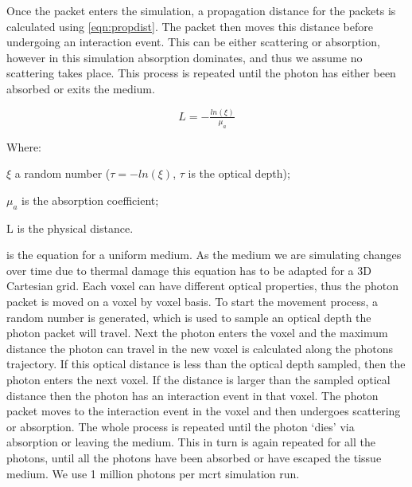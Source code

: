 Once the packet enters the simulation, a propagation distance for the packets is calculated using \cref{eqn:propdist}. The packet then moves this distance before undergoing an interaction event. This can be either scattering or absorption, however in this simulation absorption dominates, and thus we assume no scattering takes place. This process is repeated until the photon has either been absorbed or exits the medium.

\begin{equation}
L = -\tfrac{ln(\xi)}{\mu_a}
\label{eqn:propdist}
\end{equation}

\noindent Where:

\indent $\xi$ a random number ($\tau = -ln(\xi)$, $\tau$ is the optical depth);

\indent $\mu_a$ is the absorption coefficient;

\indent L is the physical distance.

\medskip

 is the equation for a uniform medium. As the medium we are simulating changes over time due to thermal damage this equation has to be adapted for a 3D Cartesian grid. Each voxel 
can have different optical properties, thus the photon packet is moved on a voxel by voxel basis. To start the movement process, a random number is generated, which is used to sample an optical depth the photon packet will travel. Next the photon enters the voxel and the maximum distance the photon can travel in the new voxel is calculated along the photons trajectory. If this optical distance is less than the optical depth sampled, then the photon enters the next voxel. If the distance is larger than the sampled optical distance then the photon has an interaction event in that voxel. The photon packet moves to the interaction event in the voxel and then undergoes scattering or absorption. The whole process is repeated until the photon `dies' via absorption or leaving the medium.
This in turn is again repeated for all the photons, until all the photons have been absorbed or have escaped the tissue medium. We use 1 million photons per \gls{mcrt} simulation run.

